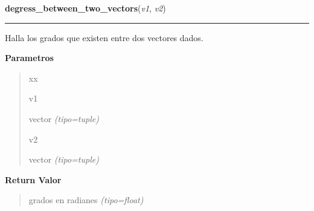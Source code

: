 \hspace{.8\funcindent}\begin{boxedminipage}{\funcwidth}

    \raggedright \textbf{degress\_between\_two\_vectors}(\textit{v1}, \textit{v2})

    \vspace{-1.5ex}

    \rule{\textwidth}{0.5\fboxrule}
\setlength{\parskip}{2ex}
Halla los grados que existen entre dos vectores dados.

\setlength{\parskip}{1ex}
      \textbf{Parametros}
      \vspace{-1ex}

      \begin{quote}
        \begin{Ventry}{xx}

          \item[v1]


vector
            {\it (tipo=tuple)}

          \item[v2]


vector
            {\it (tipo=tuple)}

        \end{Ventry}

      \end{quote}

      \textbf{Return Valor}
    \vspace{-1ex}

      \begin{quote}

grados en radianes
      {\it (tipo=float)}

      \end{quote}

    \end{boxedminipage}

    \label{src:check_goban_moved:check_directions}

    \vspace{0.5ex}

